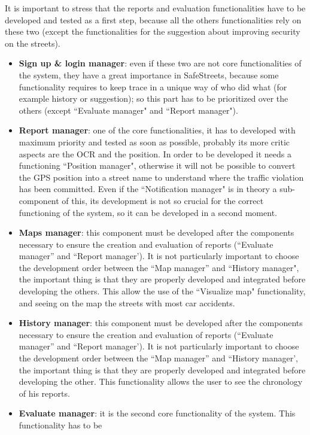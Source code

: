 \documentclass[12pt,a4paper]{report}
\begin{document}
			\newpage
			It is important to stress that the reports and evaluation functionalities have to be developed and tested
			as a first step, because all the others functionalities rely on these two (except the functionalities for the suggestion
			about improving security on the streets).
			\begin{itemize}
				\item \textbf{Sign up \& login manager}: even if these two are not core functionalities of the system, they have a
					great importance in SafeStreets, because some functionality requires to keep trace in a unique way of
					who did what (for example history or suggestion); so this part has to be prioritized over the others
					(except ``Evaluate manager" and ``Report manager"). 
				\item \textbf{Report manager}: one of the core functionalities, it has to developed with maximum priority
					and tested as soon as possible, probably its more critic aspects are the OCR and the position. In order
					to be developed it needs a functioning ``Position manager", otherwise it will not be possible to convert
					the GPS position into a street name to understand where the traffic violation has been committed.
					Even if the ``Notification manager"  is in theory a sub-component of this, its development is not so
					crucial for the correct functioning of the system, so it can be developed in a second moment.  
				\item \textbf{Maps manager}: this component must be developed after the components necessary to
					ensure the creation and evaluation of reports (``Evaluate manager'' and ``Report manager'). It is not
					particularly important to choose the development order between the ``Map manager'' and ``History
					manager", the important thing is that they are properly developed and integrated before developing
					the others. This allow the use of the ``Visualize map" functionality, and seeing on the map the streets with
					most car accidents.
				\item \textbf{History manager}:  this component must be developed after the components necessary to
					ensure the creation and evaluation of reports (``Evaluate manager'' and ``Report manager'). It is not
					particularly important to choose the development order between the ``Map manager'' and ``History
					manager', the important thing is that they are properly developed and integrated before developing
					the other. This functionality allows the user to see the chronology of his reports.
				\item \textbf{Evaluate manager}: it is the second core functionality of the system. This functionality has to be

\end{itemize}
\end{document}
